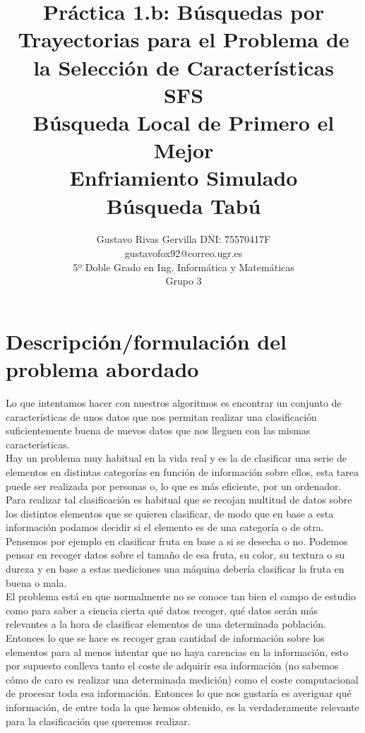 \documentclass[10pt,a4paper]{article}
\author{Gustavo Rivas Gervilla DNI: 75570417F \\ gustavofox92@correo.ugr.es \\5º Doble Grado en Ing. Informática y Matemáticas \\Grupo 3}
\title{Práctica 1.b: Búsquedas por Trayectorias para el Problema de la Selección de Características \\ SFS \\ Búsqueda Local de Primero el Mejor \\ Enfriamiento Simulado \\ Búsqueda Tabú}
\date{}
\begin{document}
\lstset{language=Python, style=customPy}
\maketitle

\newpage

\tableofcontents

\newpage

\section{\color[rgb]{0.0,0.0,0.21}Descripción/formulación del problema abordado}
Lo que intentamos hacer con nuestros algoritmos es encontrar un conjunto de características de unos datos que nos permitan realizar una clasificación suficientemente buena de nuevos datos que nos lleguen con las mismas características.\\

Hay un problema muy habitual en la vida real y es la de clasificar una serie de elementos en distintas categorías en función de información sobre ellos, esta tarea puede ser realizada por personas o, lo que es más eficiente, por un ordenador. Para realizar tal clasificación es habitual que se recojan multitud de datos sobre los distintos elementos que se quieren clasificar, de modo que en base a esta información podamos decidir si el elemento es de una categoría o de otra. Pensemos por ejemplo en clasificar fruta en base a si se desecha o no. Podemos pensar en recoger datos sobre el tamaño de esa fruta, su color, su textura o su dureza y en base a estas mediciones una máquina debería clasificar la fruta en buena o mala.\\

El problema está en que normalmente no se conoce tan bien el campo de estudio como para saber a ciencia cierta qué datos recoger, qué datos serán más relevantes a la hora de clasificar elementos de una determinada población. Entonces lo que se hace es recoger gran cantidad de información sobre los elementos para al menos intentar que no haya carencias en la información, esto por supuesto conlleva tanto el coste de adquirir esa información (no sabemos cómo de caro es realizar una determinada medición) como el coste computacional de procesar toda esa información. Entonces lo que nos gustaría es averiguar qué información, de entre toda la que hemos obtenido, es la verdaderamente relevante para la clasificación que queremos realizar.\\
\end{document}
